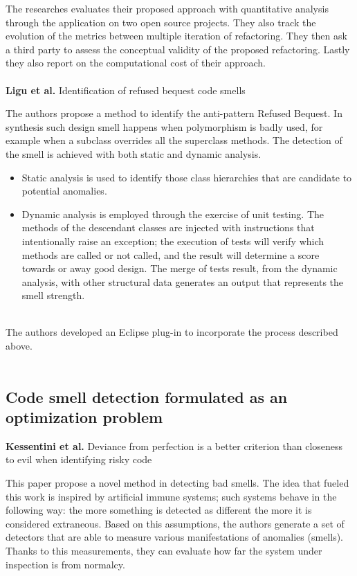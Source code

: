 The researches evaluates their proposed approach with quantitative analysis through the application on two open source projects. They also track the evolution of the metrics between multiple iteration of refactoring.
They then ask a third party to assess the conceptual validity of the proposed refactoring.
Lastly they also report on the computational cost of their approach.
\\
\\
\textbf{Ligu et al.} \cite{ligu2013identification} Identification of refused bequest code smells

The authors propose a method to identify the anti-pattern Refused Bequest. In synthesis such design smell happens when polymorphism is badly used, for example when a subclass overrides all the superclass methods.
The detection of the smell is achieved with both static and dynamic analysis.
\begin{itemize}
    \item Static analysis is used to identify those class hierarchies that are candidate to potential anomalies.
    \item Dynamic analysis is employed through the exercise of unit testing. The methods of the descendant classes are injected with instructions that intentionally raise an exception; the execution of tests will verify which methods are called or not called, and the result will determine a score towards or away good design. The merge of tests result, from the dynamic analysis, with other structural data generates an output that represents the smell strength.
\end{itemize}
\\
The authors developed an Eclipse plug-in to incorporate the process described above.
\\
\\
\subsection{Code smell detection formulated as an optimization problem}
\textbf{Kessentini et al.} \cite{kessentini2010deviance} Deviance from perfection is a better criterion than closeness to evil when identifying risky code

This paper propose a novel method in detecting bad smells. The idea that fueled this work is inspired by artificial immune systems; such systems behave in the following way: the more something is detected as different the more it is considered extraneous.
Based on this assumptions, the authors generate a set of detectors that are able to measure various manifestations of anomalies (smells). Thanks to this measurements, they can evaluate how far the system under inspection is from normalcy. 

